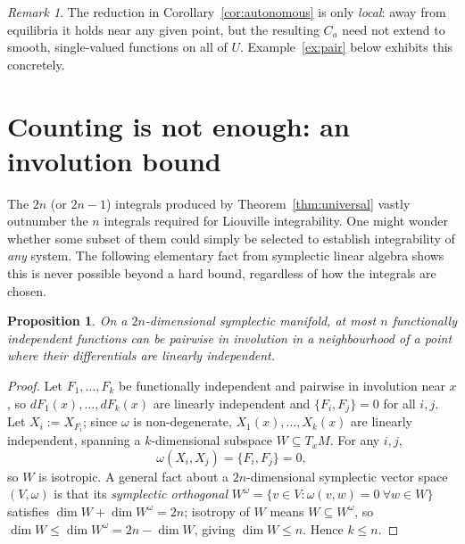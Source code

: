 \documentclass[11pt]{article}
\newtheorem{proposition}[theorem]{Proposition}
\theoremstyle{definition}
\theoremstyle{remark}
\newtheorem{remark}[theorem]{Remark}
\newcommand{\PB}[2]{\{#1,#2\}}
\begin{document}
\begin{remark}
The reduction in Corollary~\ref{cor:autonomous} is only \emph{local}: away
from equilibria it holds near any given point, but the resulting $C_a$ need
not extend to smooth, single-valued functions on all of $U$. Example~\ref{ex:pair}
below exhibits this concretely.
\end{remark}

\section{Counting is not enough: an involution bound}\label{sec:involution}

The $2n$ (or $2n-1$) integrals produced by Theorem~\ref{thm:universal} vastly
outnumber the $n$ integrals required for Liouville integrability. One might
wonder whether some subset of them could simply be selected to establish
integrability of \emph{any} system. The following elementary fact from
symplectic linear algebra shows this is never possible beyond a hard bound,
regardless of how the integrals are chosen.

\begin{proposition}\label{prop:bound}
On a $2n$-dimensional symplectic manifold, at most $n$ functionally
independent functions can be pairwise in involution in a neighbourhood of a
point where their differentials are linearly independent.
\end{proposition}

\begin{proof}
Let $F_1,\dots,F_k$ be functionally independent and pairwise in involution
near $x$, so $dF_1(x),\dots,dF_k(x)$ are linearly independent and
$\PB{F_i}{F_j}=0$ for all $i,j$. Let $X_i:=X_{F_i}$; since $\omega$ is
non-degenerate, $X_1(x),\dots,X_k(x)$ are linearly independent, spanning a
$k$-dimensional subspace $W\subseteq T_xM$. For any $i,j$,
\begin{equation}
\omega(X_i,X_j)=\PB{F_i}{F_j}=0,
\end{equation}
so $W$ is isotropic. A general fact about a $2n$-dimensional symplectic
vector space $(V,\omega)$ is that its \emph{symplectic orthogonal}
$W^{\omega}=\{v\in V:\omega(v,w)=0\ \forall w\in W\}$ satisfies
$\dim W+\dim W^\omega=2n$; isotropy of $W$ means $W\subseteq W^\omega$, so
$\dim W\le\dim W^\omega=2n-\dim W$, giving $\dim W\le n$. Hence $k\le n$.
\end{proof}
\end{document}
